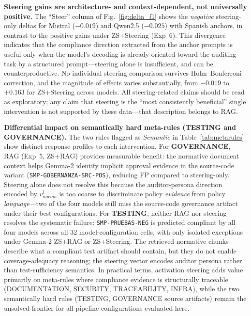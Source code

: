 \documentclass{ieeeaccess}
\begin{document}
\textbf{Steering gains are architecture- and context-dependent, not universally positive.} The ``Steer'' column of Fig.~\ref{fig:delta_f1} shows the \emph{negative} steering-only deltas for Mistral ($-0.019$) and Qwen2.5 ($-0.025$) with Spanish anchors, in contrast to the positive gains under ZS+Steering (Exp~6). This divergence indicates that the compliance direction extracted from the anchor prompts is useful only when the model's decoding is already oriented toward the auditing task by a structured prompt---steering alone is insufficient, and can be counterproductive. No individual steering comparison survives Holm--Bonferroni correction, and the magnitude of effects varies substantially, from $-0.019$ to $+0.163$ for ZS+Steering across models. All steering-related claims should be read as exploratory; any claim that steering is the ``most consistently beneficial'' single intervention is not supported by these data---that description belongs to RAG.

\textbf{Differential impact on semantically hard meta-rules (TESTING and GOVERNANCE).} The two rules flagged as \emph{Semantic} in Table~\ref{tab:metarules} show distinct response profiles to each intervention. For \textbf{GOVERNANCE}, RAG (Exp~5, ZS+RAG) provides measurable benefit: the normative document context helps Gemma-2 identify implicit approval evidence in the source-code variant (\texttt{SMP-GOBERNANZA-SRC-POS}), reducing FP compared to steering-only. Steering alone does not resolve this because the auditor-persona direction encoded by $v_{norma}^l$ is too coarse to discriminate policy \emph{evidence} from policy \emph{language}---two of the four models still miss the source-code governance artifact under their best configurations. For \textbf{TESTING}, neither RAG nor steering resolves the systematic failure: \texttt{SMP-PRUEBAS-NEG} is predicted compliant by all four models across all 32 model-configuration cells, with only isolated exceptions under Gemma-2 ZS+RAG or ZS+Steering. The retrieved normative chunks describe what a compliant test artifact should contain, but they do not enable coverage-adequacy reasoning; the steering vector encodes auditor persona rather than test-sufficiency semantics. In practical terms, activation steering adds value primarily on meta-rules where compliance evidence is structurally traceable (DOCUMENTATION, SECURITY, TRACEABILITY, INFRA), while the two semantically hard rules (TESTING, GOVERNANCE source artifacts) remain the unsolved frontier for all pipeline configurations evaluated here.
\end{document}

